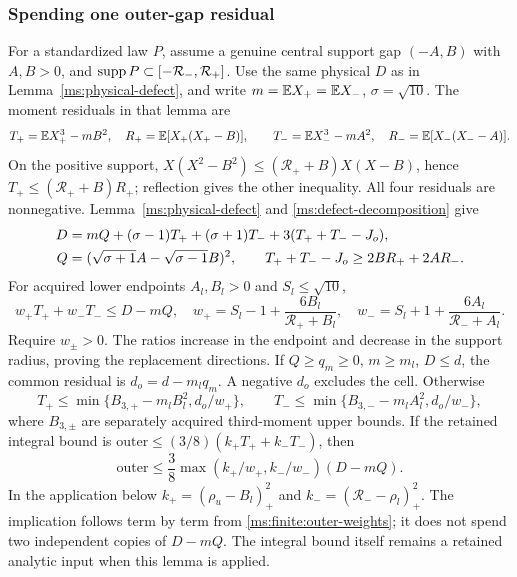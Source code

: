 \subsubsection{Spending one outer-gap residual}
For a standardized law $P$, assume a genuine central support gap
$(-A,B)$ with $A,B>0$, and $\operatorname{supp} P\subset[-\mathcal R_-,\mathcal R_+]$. Use the same physical
$D$ as in Lemma~\ref{ms:physical-defect}, and write
$m=\mathbb E X_+=\mathbb E X_-$, $\sigma=\sqrt{10}$. The moment residuals in that
lemma are
\[
 T_+=\mathbb E X_+^3-mB^2,\quad R_+=\mathbb E[X_+(X_+-B)],
 \qquad T_-=\mathbb E X_-^3-mA^2,\quad R_-=\mathbb E[X_-(X_--A)].
\]
On the positive support,
$X(X^2-B^2)\le(\mathcal R_++B)X(X-B)$, hence
$T_+\le(\mathcal R_++B)R_+$; reflection gives the other inequality.
All four residuals are nonnegative. Lemma~\ref{ms:physical-defect}
and \eqref{ms:defect-decomposition} give
\begin{align}
 D&=mQ+(\sigma-1)T_++(\sigma+1)T_-+3(T_++T_--J_o),\notag\\
 Q&=(\sqrt{\sigma+1}A-\sqrt{\sigma-1}B)^2,
 \qquad T_++T_--J_o\ge2BR_++2AR_-.
 \label{ms:finite:outer-decomposition}
\end{align}
For acquired lower endpoints $A_l,B_l>0$ and $S_l\le\sqrt{10}$,
\begin{equation}
 w_+T_++w_-T_-\le D-mQ,\quad
 w_+=S_l-1+\frac{6B_l}{\mathcal R_++B_l},\quad
 w_-=S_l+1+\frac{6A_l}{\mathcal R_-+A_l}.
 \label{ms:finite:outer-weights}
\end{equation}
Require $w_\pm>0$. The ratios increase in the endpoint and decrease
in the support radius, proving the replacement directions.
If $Q\ge q_m\ge0$, $m\ge m_l$, $D\le d$, the common residual is
$d_o=d-m_lq_m$. A negative $d_o$ excludes the cell. Otherwise
\[
 T_+\le\min\{B_{3,+}-m_lB_l^2,d_o/w_+\},\qquad
 T_-\le\min\{B_{3,-}-m_lA_l^2,d_o/w_-\},
\]
where $B_{3,\pm}$ are separately acquired third-moment upper bounds.
If the retained integral bound is
$\mathrm{outer}\le(3/8)(k_+T_++k_-T_-)$, then
\[
 \mathrm{outer}\le\frac38\max(k_+/w_+,k_-/w_-)(D-mQ).
\]
In the application below $k_+=(\rho_u-B_l)_+^2$ and
$k_-=(\mathcal R_--\rho_l)_+^2$. The implication follows term by
term from \eqref{ms:finite:outer-weights}; it does not spend two
independent copies of $D-mQ$. The integral bound itself remains a
retained analytic input when this lemma is applied.

